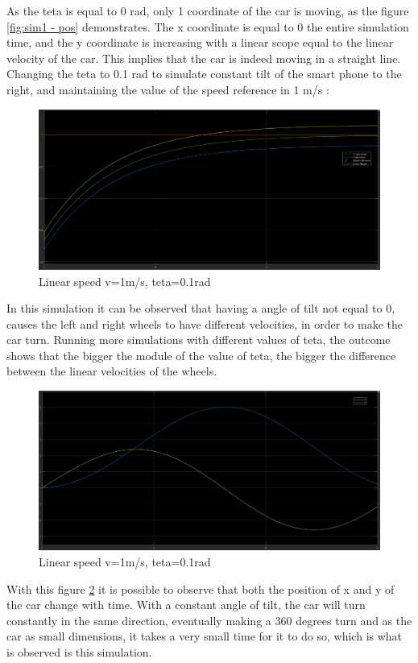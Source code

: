 As the teta is equal to 0 rad, only 1 coordinate of the car is moving, as the figure \ref{fig:sim1 - pos} demonstrates. The x coordinate is equal to 0 the entire simulation time, and the y coordinate is increasing with a linear scope equal to the linear velocity of the car. This implies that the car is indeed moving in a straight line.\\
\newpage
Changing the teta to 0.1 rad to simulate constant tilt of the smart phone to the right, and maintaining the value of the speed reference in 1 m/s :\
\begin{figure}[!h]
\centering
\includegraphics[width=1.0\textwidth]{./img/vel101.PNG}
\caption {\label{fig:sim2 - vel}Linear speed v=1m/s, teta=0.1rad}
\end{figure}
In this simulation it can be observed that having a angle of tilt not equal to 0, causes the left and right wheels to have different velocities, in order to make the car turn. Running more simulations with different values of teta, the outcome shows that the bigger the module of the value of teta, the bigger the difference between the linear velocities of the wheels.
\begin{figure}[!ht]
\centering
\includegraphics[width=1.0\textwidth]{./img/xy101.PNG}
\caption {\label{fig:sim2 - pos}Linear speed v=1m/s, teta=0.1rad}
\end{figure}
With this figure \ref{fig:sim2 - pos} it is possible to observe that both the position of x and y of the car change with time. With a constant angle of tilt, the car will turn constantly in the same direction, eventually making a 360 degrees turn and as the car as small dimensions, it takes a very small time for it to do so, which is what is observed is this simulation.